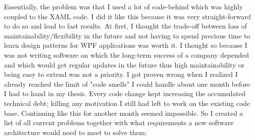 Essentially, the problem was that I used a lot of code-behind which was highly coupled to the XAML code. I did it like this because it was very straight-forward to do so and lead to fast results. At first, I thought the trade-off between loss of maintainability/flexibility in the future and not having to spend precious time to learn design patterns for WPF applications was worth it. I thought so because I was not writing software on which the long-term success of a company depended and which would get regular updates in the future thus high maintainability or being easy to extend was not a priority. I got proven wrong when I realized I already reached the limit of "code smells" I could handle about one month before I had to hand in my thesis. Every code change kept increasing the accumulated technical debt; killing any motivation I still had left to work on the existing code base. Continuing like this for another month seemed impossible. So I created a list of all current problems together with what requirements a new software architecture would need to meet to solve them:

